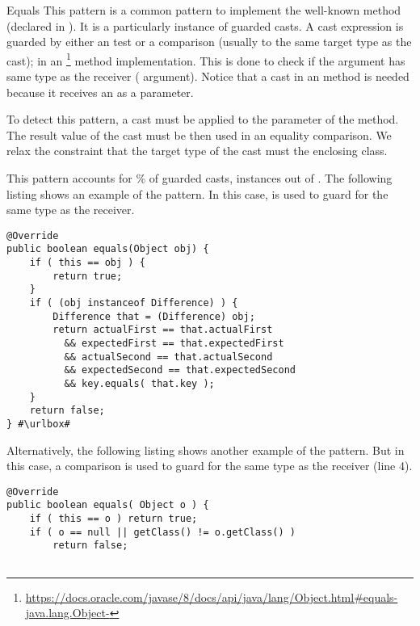 \begin{pattern}{Equals}
This pattern is a common pattern to implement the well-known  method (declared in ).
It is a particularly instance of guarded casts.
A cast expression is guarded by either an  test or a  comparison (usually to the same target type as the cast);
in an %
\footnote{\url{https://docs.oracle.com/javase/8/docs/api/java/lang/Object.html\#equals-java.lang.Object-}} method implementation.
This is done to check if the argument has same type as the receiver
( argument).
Notice that a cast in an  method is needed because it
receives an  as a parameter.

To detect this pattern,
a cast must be applied to the parameter of the  method.
The result value of the cast must be then used in an equality comparison.
We relax the constraint that the target type of the cast must the enclosing class.

\instances{}
This pattern accounts for \nEqualsOutofGuarded\% of guarded casts,
\nEqualsPattern{} instances out of \nGuarded{}.
The following listing shows an example of the \thisp{} pattern.
In this case,
 is used to guard for the same type as the receiver.

\def\urlvar{http://bit.ly/neo4j_neo4j_2vJw94J}
\begin{verbatim}
@Override
public boolean equals(Object obj) {
    if ( this == obj ) {
        return true;
    }
    if ( (obj instanceof Difference) ) {
        Difference that = (Difference) obj;
        return actualFirst == that.actualFirst
          && expectedFirst == that.expectedFirst
          && actualSecond == that.actualSecond 
          && expectedSecond == that.expectedSecond
          && key.equals( that.key );
    }
    return false;
} #\urlbox#
\end{verbatim}

Alternatively, the following listing shows another example of the \thisp{} pattern.
But in this case,
a  comparison is used to guard for the same type as the receiver (line 4).

\def\urlvar{http://bit.ly/neo4j_neo4j_2vKP0MW}
\begin{verbatim}
@Override
public boolean equals( Object o ) {
    if ( this == o ) return true;
    if ( o == null || getClass() != o.getClass() )
        return false;


\end{verbatim}
\end{pattern}
